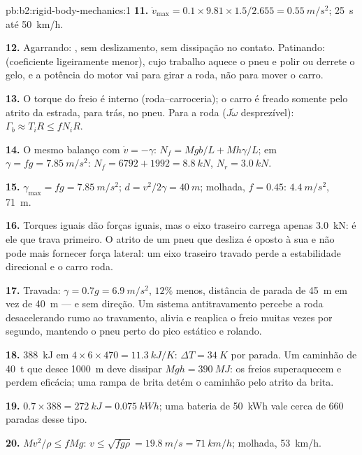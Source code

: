 \begin{solution}{pb:b2:rigid-body-mechanics:1}
\textbf{11.} $\dot v_{\max} = 0.1 \times 9.81 \times 1.5/2.655 = \qty{0.55}{m/s^2}$;
\qty{25}{s} até \qty{50}{km/h}.

\textbf{12.} Agarrando: , sem deslizamento, sem dissipação no
contato. Patinando:  (coeficiente ligeiramente menor),
cujo trabalho aquece o pneu e polir ou derrete o gelo, e a potência do
motor vai para girar a roda, não para mover o carro.

\textbf{13.} O torque do freio é interno (roda--carroceria); o carro é
freado somente pelo atrito da estrada, para trás, no pneu. Para a roda
($J\dot\omega$ desprezível): $\Gamma_b \approx T_iR \le fN_iR$.

\textbf{14.} O mesmo balanço com $\dot v = -\gamma$: $N_f = Mgb/L + Mh\gamma/L$;
em $\gamma = fg = \qty{7.85}{m/s^2}$: $N_f = 6792 + 1992 = \qty{8.8}{kN}$, $N_r =
\qty{3.0}{kN}$.

\textbf{15.} $\gamma_{\max} = fg = \qty{7.85}{m/s^2}$; $d = v^2/2\gamma = \qty{40}{m}$;
molhada, $f = 0.45$: $\qty{4.4}{m/s^2}$, \qty{71}{m}.

\textbf{16.} Torques iguais dão forças iguais, mas o eixo traseiro carrega
apenas \qty{3.0}{kN}: é ele que trava primeiro. O atrito de um pneu que desliza é oposto
à sua  e não pode mais fornecer força lateral: um eixo
traseiro travado perde a estabilidade direcional e o carro roda.

\textbf{17.} Travada: $\gamma = 0.7g = \qty{6.9}{m/s^2}$, $12\%$ menos, distância
de parada de \qty{45}{m} em vez de \qty{40}{m} --- e sem direção. Um sistema
antitravamento percebe a roda desacelerando rumo ao travamento, alivia e
reaplica o freio muitas vezes por segundo, mantendo o pneu perto do
pico estático e rolando.

\textbf{18.} \qty{388}{kJ} em $4 \times 6 \times 470 = \qty{11.3}{kJ/K}$: $\Delta T =
\qty{34}{K}$ por parada. Um caminhão de \qty{40}{t} que desce \qty{1000}{m} deve dissipar
$Mgh = \qty{390}{MJ}$: os freios superaquecem e perdem eficácia; uma rampa de
brita detém o caminhão pelo atrito da brita.

\textbf{19.} $0.7 \times 388 = \qty{272}{kJ} = \qty{0.075}{kWh}$; uma bateria de \qty{50}{kWh}
vale cerca de $660$ paradas desse tipo.

\textbf{20.} $Mv^2/\rho \le fMg$: $v \le \sqrt{fg\rho} = \qty{19.8}{m/s} =
\qty{71}{km/h}$; molhada, \qty{53}{km/h}.


\end{solution}
